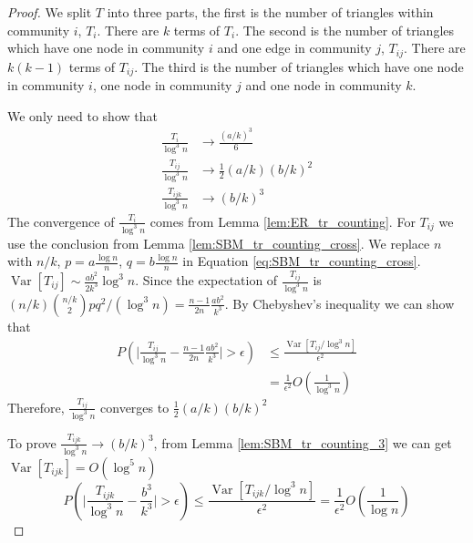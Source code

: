 \documentclass[entropy,article,submit,moreauthors,pdftex]{Definitions/mdpi}
\newcommand{\1}{\mathbbm{1}}
\DeclareMathOperator{\Var}{Var}
\begin{document}
\begin{proof}
	We split $T$ into three parts, the first is the number of triangles within community $i$, $T_i$. There are $k$ terms of $T_i$.
	The second is the number of triangles which have one node in community $i$ and one edge in community $j$, $T_{ij}$. There are $k(k-1)$ terms of $T_{ij}$. The third is the number of triangles which have one node in community $i$, one node in community $j$ and one node in community $k$.
	
	We only need to show that
	\begin{align}
	\frac{T_i}{\log ^3 n} &\to \frac{(a/k)^3}{6} \\
	\frac{T_{ij}}{\log^3 n}& \to \frac{1}{2}(a/k)(b/k)^2\\
	\frac{T_{ijk}}{\log^3 n} & \to (b/k)^3
	\end{align}
	The convergence of $\frac{T_i}{\log ^3 n}$ comes from Lemma \ref{lem:ER_tr_counting}.
	For $T_{ij}$ we use the conclusion from Lemma \ref{lem:SBM_tr_counting_cross}.
	We replace $n$ with $n/k$, $p=a\frac{\log n}{n}$, $q=b\frac{\log n}{n}$ in Equation \eqref{eq:SBM_tr_counting_cross}.
	$\Var[T_{ij}] \sim \frac{ab^2}{2k^3} \log^3 n$. Since the expectation of $\frac{T_{ij}}{\log^3 n}$ is $(n/k)\binom{n/k}{2}pq^2/(\log^3 n)
	=\frac{n-1}{2n}\frac{ab^2}{k^3}$. By Chebyshev's inequality we can show that 
	\begin{align*}
	P( \Big|\frac{T_{ij}}{\log^3 n} - \frac{n-1}{2n}\frac{ab^2}{k^3} \Big| > \epsilon) &\leq \frac{\Var[T_{ij} / \log^3 n]}{\epsilon^2} \\
	& = \frac{1}{\epsilon^2}
	O(\frac{1}{\log^3 n})
	\end{align*}
	Therefore, $\frac{T_{ij}}{\log^3 n} $ converges to $\frac{1}{2}(a/k)(b/k)^2$
	
	To prove $\frac{T_{ijk}}{\log^3 n}\to (b/k)^3$, from Lemma \ref{lem:SBM_tr_counting_3} we can get $\Var[T_{ijk}] = O(\log^5 n)$
	$$
	P( \Big|\frac{T_{ijk}}{\log^3 n} -\frac{b^3}{k^3} \Big| > \epsilon) \leq \frac{\Var[T_{ijk} / \log^3 n]}{\epsilon^2} = \frac{1}{\epsilon^2}
	O(\frac{1}{\log n})
	$$
\end{proof}
\end{document}
